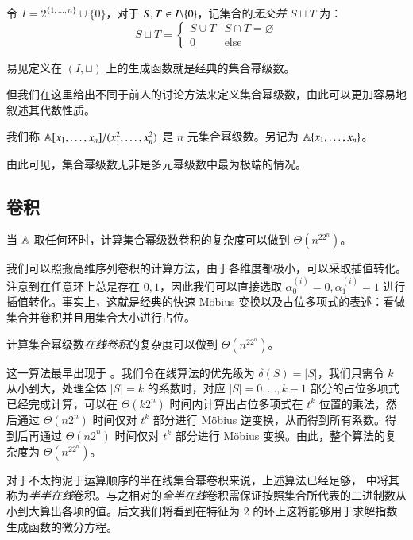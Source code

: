 \begin{definition}[集合幂级数的集合定义]
令 $I=2^{\{1,\dots,n\}}\cup\{0\}$，对于 $S,T\in {I \backslash \{0\}}$，记集合的\emph{无交并} $S\sqcup T$ 为：
$$
S\sqcup T = \begin{cases}
S \cup T & S\cap T = \varnothing\\
0 & \mathrm{else}
\end{cases}
$$

易见定义在 $(I,\sqcup)$ 上的生成函数就是经典的集合幂级数。
\end{definition}

但我们在这里给出不同于前人的讨论方法来定义集合幂级数，由此可以更加容易地叙述其代数性质。

\begin{definition}[集合幂级数的多元幂级数定义]
我们称 $\mathbb A[x_1,\dots,x_n]/(x_1^{2},\dots,x_n^{2})$ 是 $n$ 元集合幂级数。另记为 $\mathbb A\{x_1,\dots,x_n\}$。
\end{definition}

由此可见，集合幂级数无非是多元幂级数中最为极端的情况。

\subsection{卷积}

\begin{theorem}\label{cupconv}
当 $\mathbb A$ 取任何环时，计算集合幂级数卷积的复杂度可以做到 $\Theta(n^22^n)$。
\end{theorem}

我们可以照搬高维序列卷积的计算方法，由于各维度都极小，可以采取插值转化。注意到在任意环上总是存在 $0,1$，因此我们可以直接选取 $\alpha^{(i)}_0= 0, \alpha^{(i)}_1= 1$ 进行插值转化。事实上，这就是经典的快速 M\"obius 变换以及占位多项式的表述：看做集合并卷积并且用集合大小进行占位。

\begin{theorem}
计算集合幂级数\emph{在线卷积}的复杂度可以做到 $\Theta(n^22^n)$。
\end{theorem}

这一算法最早出现于 \cite{walk}。我们令在线算法的优先级为 $\delta(S) = |S|$，我们只需令 $k$ 从小到大，处理全体 $|S|=k$ 的系数时，对应 $|S|=0,\dots,k-1$ 部分的占位多项式已经完成计算，可以在 $\Theta(k 2^n)$ 时间内计算出占位多项式在 $t^k$ 位置的乘法，然后通过 $\Theta(n2^n)$ 时间仅对 $t^k$ 部分进行 M\"obius 逆变换，从而得到所有系数。得到后再通过 $\Theta(n2^n)$ 时间仅对 $t^k$ 部分进行 M\"obius 变换。由此，整个算法的复杂度为 $\Theta(n^22^n)$。

对于不太拘泥于运算顺序的半在线集合幂卷积来说，上述算法已经足够，\cite{nimberpoly} 中将其称为\emph{半半在线}卷积。与之相对的\emph{全半在线}卷积需保证按照集合所代表的二进制数从小到大算出各项的值。后文我们将看到在特征为 $2$ 的环上这将能够用于求解指数生成函数的微分方程。

